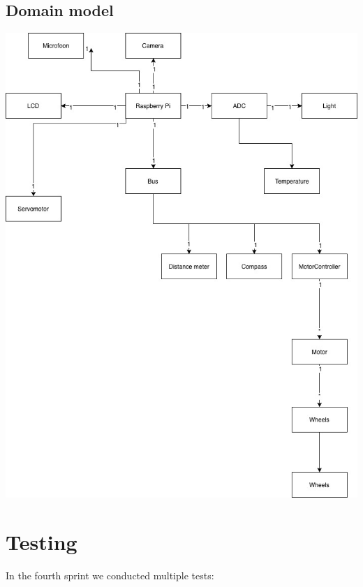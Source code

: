 \documentclass[12pt]{article}
\begin{document}
 	\subsection{Domain model}
 	\includegraphics[width=\linewidth]{DomainModel.jpeg}
 	\newpage
 	\section{Testing}
 	In the fourth sprint we conducted multiple tests:
\end{document}
